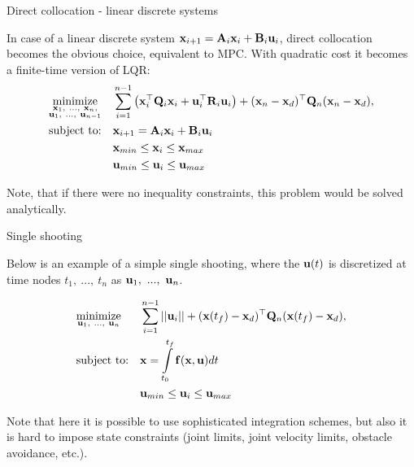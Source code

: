 \documentclass{beamer}
\begin{document}
\begin{frame}{Direct collocation - linear discrete systems}
	\begin{flushleft}
		
		In case of a linear discrete system $\mathbf{x}_{i+1} = \mathbf{A}_i \mathbf{x}_i + \mathbf{B}_i \mathbf{u}_i$, direct collocation becomes the obvious choice, equivalent to MPC. With quadratic cost it becomes a finite-time version of LQR:
		\begin{equation*}
			\begin{aligned}
				& \underset{\substack{\mathbf{x}_1, \ ..., \ \mathbf{x}_n, \\ \mathbf{u}_1, \ ..., \ \mathbf{u}_{n-1}}}{\text{minimize}}
				& & \sum\limits_{i=1}^{n-1} \left( \mathbf{x}_i^\top \mathbf{Q}_i \mathbf{x}_i + \mathbf{u}_i^\top \mathbf{R}_i \mathbf{u}_i \right) + (\mathbf{x}_n - \mathbf{x}_d)^\top \mathbf{Q}_n (\mathbf{x}_n - \mathbf{x}_d), \\
				& \text{subject to:}
				& & \mathbf{x}_{i+1} = \mathbf{A}_i \mathbf{x}_i + \mathbf{B}_i \mathbf{u}_i \\
				& & & \mathbf{x}_{min} \leq \mathbf{x}_i \leq \mathbf{x}_{max} \\
				& & & \mathbf{u}_{min} \leq \mathbf{u}_i \leq \mathbf{u}_{max}
			\end{aligned}
		\end{equation*}
		
		Note, that if there were no inequality constraints, this problem would be solved analytically.
		
	\end{flushleft}
\end{frame}




\begin{frame}{Single shooting}
	\begin{flushleft}
		
		Below is an example of a simple single shooting, where the $\mathbf{u}(t)$ is discretized at time nodes $t_1, \ ..., \ t_n$ as $\mathbf{u}_1, \ ..., \  \mathbf{u}_n$.
		
		\begin{equation}
			\begin{aligned}
				& \underset{\substack{\bo{u}_1, \ ..., \ \bo{u}_n}}{\text{minimize}}
				& & \sum\limits_{i=1}^{n-1} ||\bo{u}_i|| + (\bo{x}(t_f) - \bo{x}_d)\T \bo{Q}_n (\bo{x}(t_f) - \bo{x}_d), \\
				& \text{subject to:}
				& & \bo{x} =  \int\limits_{t_0}^{t_f} \bo{f}(\bo{x}, \bo{u}) dt\\
				& & & \bo{u}_{min} \leq \bo{u}_i \leq \bo{u}_{max}
			\end{aligned}
		\end{equation}
		
		Note that here it is possible to use sophisticated integration schemes, but also it is hard to impose state constraints (joint limits, joint velocity limits, obstacle avoidance, etc.).
		
		
	\end{flushleft}
\end{frame}
\end{document}
